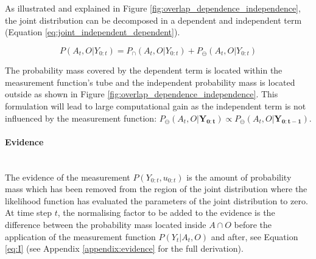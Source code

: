 As illustrated and explained in Figure \ref{fig:overlap_dependence_independence}, the joint distribution can be decomposed in a 
dependent and independent term (Equation \ref{eq:joint_independent_dependent}). 

\begin{equation}\label{eq:joint_independent_dependent}
 P(A_t,O|Y_{0:t}) = P_{\cap}(A_t,O|Y_{0:t}) + P_{\ominus}(A_t,O|Y_{0:t})
\end{equation}

The probability mass covered by the dependent term is located within the measurement function's tube and the independent probability mass 
is located outside as shown in Figure \ref{fig:overlap_dependence_independence}. This formulation will lead to large computational gain 
as the independent term is not influenced by the measurement function: 
$P_{\ominus}(A_t,O|\mathbf{Y_{0:t}}) \propto P_{\ominus}(A_t,O|\mathbf{Y_{0:t-1}})$.

\paragraph{Evidence}\\
The evidence of the measurement $P(Y_{0:t},u_{0:t})$ is the amount of probability mass which has been removed from the region of the joint 
distribution where the likelihood function has evaluated the parameters of the joint distribution to zero. At time step $t$, the normalising factor to be added to 
the evidence is the difference between the probability mass located inside $A\cap O$ before the application of the measurement 
function $P(Y_t|A_t,O)$ and after, see Equation \ref{eq:I} (see Appendix \ref{appendix:evidence} for the full derivation).

